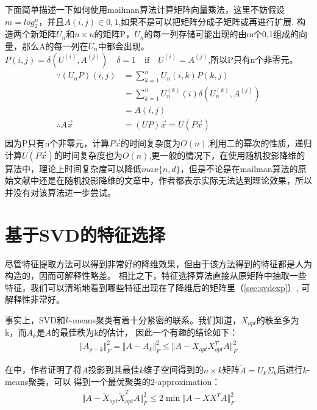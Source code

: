\documentclass{ctexart}
\begin{document}
    下面简单描述一下如何使用mailman算法计算矩阵向量乘法，这里不妨假设$ m = log_2^n$，并且$A(i,j) \in {0,1}$,如果不是可以把矩阵分成子矩阵或再进行扩展.
    构造两个新矩阵$U_{n}$和$n \times n$的矩阵P，$U_{n}$的每一列存储可能出现的由m个{0,1}组成的向量，那么A的每一列在$U_{n}$中都会出现。$P(i,j) = \delta(U^{(i)},A^{(j)})\quad \delta = 1 \quad \text{if} \quad U^{(i)} = A^{(j)}$,所以P只有n个非零元。
    \begin{align*}
    \because (U_{n}P)(i,j) &=\sum_{k=1}^n U_{n}(i,k)P(k,j)\\
    &=\sum_{k=1}^n U_{n}^{(k)}(i)\delta (U_{n}^{(k)},A^{(j)})\\
    &=A(i,j)\\
    \therefore A\vec{x} &=(UP)\vec{x} = U(P\vec{x})\\
    \end{align*}
    因为P只有n个非零元，计算$P\vec{x}$的时间复杂度为$O(n)$,利用二的幂次的性质，递归计算$U(P\vec{x})$的时间复杂度也为$O(n)$,更一般的情况下，在使用随机投影降维的算法中，理论上时间复杂度可以降低$max\{n,d\}$，但是不论是在mailman算法的原始文献中还是在随机投影降维的文章中，作者都表示实际无法达到理论效果，所以并没有对该算法进一步尝试。


    \section{基于SVD的特征选择}
    \label{sec:svdsec}
    尽管特征提取方法可以得到非常好的降维效果，但由于该方法得到的特征都是人为构造的，因而可解释性略差。
    相比之下，特征选择算法直接从原矩阵中抽取一些特征，我们可以清晰地看到哪些特征出现在了降维后的矩阵里（\autoref{sec:svdexp}）,
    可解释性非常好。

    事实上，SVD和$k$-means聚类有着十分紧密的联系。我们知道，$X_{opt}$的秩至多为k，而$A_k$是$A$的最佳秩为k的估计，
    因此一个有趣的结论如下：
    \begin{align*}
        \Vert A_{\rho - k} \Vert_F^2 = \Vert A - A_k \Vert_F^2 \leq \Vert A - X_{opt} X_{opt}^T A \Vert_F^2
    \end{align*}

    在\cite{drineas1999clustering}中，作者证明了将$A$投影到其最佳$k$维子空间得到的$n \times k$矩阵$\tilde{A}=U_k \Sigma_k$后进行$k$-means聚类，可以
    得到一个最优聚类的2-approximation：
    \begin{align*}
        \Vert A - \tilde{X}_{opt} \tilde{X}_{opt}^T A \Vert_F^2 \leq 2 \min \Vert A - X X^T A \Vert_F^2
    \end{align*}
\end{document}
